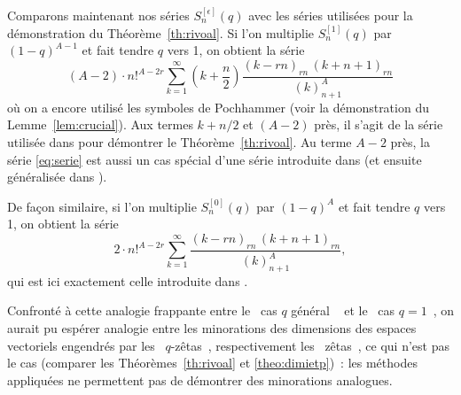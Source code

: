\documentclass[12pt]{amsart}
\newcommand{\ep}{\epsilon}
\theoremstyle{remark}
\numberwithin{equation}{section}
\begin{document}
Comparons maintenant nos s{\'e}ries $S^{[\ep]}_n(q)$
avec les s{\'e}ries utilis{\'e}es pour la d{\'e}monstration du
Th{\'e}or{\`e}me~\ref{th:rivoal}. 
Si l'on multiplie $S^{[1]}_n(q)$ par $(1-q)^{A-1}$ et fait tendre $q$ 
vers 1, on obtient la s{\'e}rie
\begin{equation} \label{eq:serie}
\left({A} -{2}\right)\cdot n!^{A-2r} 
\sum _{k=1} ^{\infty}\left(k+\frac n2\right)
\frac {(k-rn)_{rn}\,(k+n+1)_{rn}} {(k)_{n+1}^A}
\end{equation}
o{\`u} on a encore utilis{\'e} les symboles de Pochhammer (voir la
d{\'e}monstration du Lemme~\ref{lem:crucial}). Aux termes $k+n/2$ et 
$({A} -{2})$ pr{\`e}s, il s'agit de la s{\'e}rie utilis{\'e}e dans \cite{ri, br} 
pour d{\'e}montrer le Th{\'e}or{\`e}me~\ref{th:rivoal}. 
Au terme $A-2$ pr{\`e}s, 
la s{\'e}rie \eqref{eq:serie} est aussi un cas sp{\'e}cial d'une
s{\'e}rie introduite dans \cite[p.~51]{ri2} (et ensuite g{\'e}n{\'e}ralis{\'e}e
dans \cite[Sec.~8]{zud0}).

De fa{\c c}on similaire, si 
l'on multiplie $S^{[0]}_n(q)$ par $(1-q)^{A}$ et fait tendre $q$ 
vers 1, on obtient la s{\'e}rie
\begin{equation*}
2\cdot n!^{A-2r}\sum _{k=1} ^{\infty}
\frac {(k-rn)_{rn}\,(k+n+1)_{rn}} {(k)_{n+1}^A},
\end{equation*}
qui est ici exactement celle introduite dans \cite{ri, br}.

Confront{\'e} {\`a} cette analogie frappante entre le {\og~cas $q$ g{\'e}n{\'e}ral ~\fg} 
et le {\og~cas $q=1$~\fg}, 
on aurait pu esp{\'e}rer analogie entre les minorations des dimensions des espaces vectoriels
engendr{\'e}s par les {\og~$q$-z{\^e}tas~\fg}, respectivement les
{\og~z{\^e}tas~\fg}, ce
qui n'est pas le cas (comparer les
Th{\'e}or{\`e}mes~\ref{th:rivoal} et \ref{theo:dimietp})~: 
les
m{\'e}thodes appliqu{\'e}es ne permettent pas de d{\'e}montrer des
minorations analogues.
\end{document}
